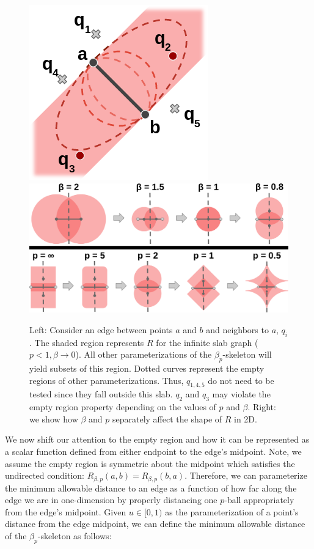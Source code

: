 \begin{figure}
    \includegraphics[width=0.34\linewidth]{figs/chap7/infinite_slab.png}
    \includegraphics[width=0.64\linewidth]{figs/chap7/variable_parameters.png}
    \caption{Left: Consider an edge between points $a$ and $b$ and neighbors to $a$, $q_{i}$.
    The shaded region represents $R$ for the infinite slab graph ($p < 1, \beta \rightarrow 0$).
    All other parameterizations of the $\beta_p$-skeleton will yield subsets of this region.
    Dotted curves represent the empty regions of other parameterizations.
    Thus, $q_{1,4,5}$ do not need to be tested since they fall outside this slab.
    $q_2$ and $q_3$ may violate the empty region property depending on the values of $p$ and $\beta$.
    Right: we show how $\beta$ and $p$ separately affect the shape of $R$ in 2D.}
    \label{fig:infinite_slab}
\end{figure}

We now shift our attention to the empty region and how it can be represented as a scalar function defined from either endpoint to the edge's midpoint.
%
Note, we assume the empty region is symmetric about the midpoint which satisfies the undirected condition: $R_{\beta,p}(a,b)=R_{\beta,p}(b,a)$.
%
Therefore, we can parameterize the minimum allowable distance to an edge as a function of how far along the edge we are in one-dimension by properly distancing one $p$-ball appropriately from the edge's midpoint.
%
Given $u \in [0, 1)$ as the parameterization of a point's distance from the edge midpoint, we can define the minimum allowable distance of the $\beta_p$-skeleton as follows:

